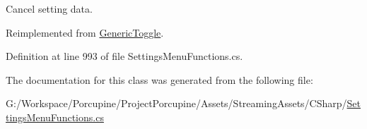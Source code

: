 Cancel setting data. 



Reimplemented from \hyperlink{class_generic_toggle_a11d9c35a3c20308376d1a126c3bfc874}{Generic\+Toggle}.



Definition at line 993 of file Settings\+Menu\+Functions.\+cs.



The documentation for this class was generated from the following file\+:\begin{DoxyCompactItemize}
\item 
G\+:/\+Workspace/\+Porcupine/\+Project\+Porcupine/\+Assets/\+Streaming\+Assets/\+C\+Sharp/\hyperlink{_settings_menu_functions_8cs}{Settings\+Menu\+Functions.\+cs}\end{DoxyCompactItemize}
